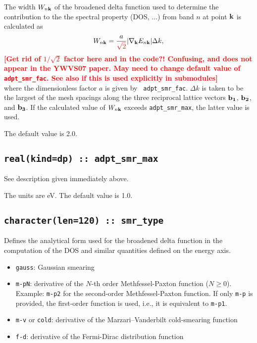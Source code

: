 The width $W_{n{\bf k}}$ of the broadened delta function used to
determine the contribution to the the spectral property (DOS, ...) from band $n$ at point ${\bf k}$
is calculated as
%
$$
W_{n{\bf k}}=\frac{a}{\textcolor{red}{\sqrt{2}}}\vert
\nabla_{\bf k} E_{n{\bf k}}\vert \Delta k,
$$ 
%
\textcolor{red}{{\bf [Get rid of $1/\sqrt{2}$ factor here and in the code?! 
Confusing, and does not appear in the YWVS07 paper. May need to change default value of
{\tt adpt\_smr\_fac}. See also if this is used explicitly in submodules]}}\\
where the dimensionless factor $a$ is given by {\tt
  adpt\_smr\_fac}. $\Delta k$ is taken to be the largest of
the mesh spacings along the three reciprocal lattice vectors ${\bf
  b_1}$, ${\bf b_2}$, and ${\bf b_3}$.  If the calculated value of
$W_{n{\bf k}}$ exceeds {\tt adpt\_smr\_max}, the latter
value is used.

The default value is 2.0.

\subsection[adpt\_smr\_max]{\tt real(kind=dp) ::
  adpt\_smr\_max}

See description given immediately above.

The units are eV. The default value is 1.0.

\subsection[smr\_type]{\tt  character(len=120) :: smr\_type}

Defines the analytical form used for the broadened delta function in
the computation of the DOS and similar quantities defined on the
energy axis.

\begin{itemize}
  
\item
  {\tt gauss}: Gaussian smearing

\item
  {\tt m-pN}: derivative of the $N$-th order
    Methfessel-Paxton function ($N\geq 0$). Example: {\tt m-p2} for the
  second-order Methfessel-Paxton function. If only {\tt m-p} is
  provided, the first-order function is used, i.e., it is equivalent to {\tt m-p1}.

\item
  {\tt m-v} or {\tt cold}: derivative of the Marzari--Vanderbilt cold-smearing function

\item
  {\tt f-d}: derivative of the Fermi-Dirac distribution function

\end{itemize}

